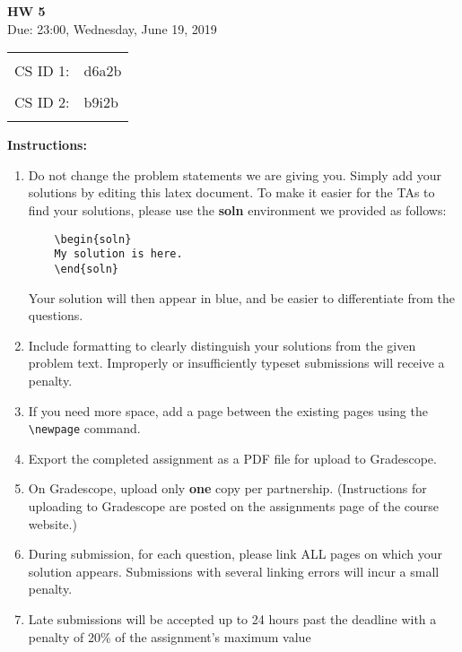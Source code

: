 \documentclass[a4paper, 20pt,fleqn]{article}
\begin{document}

\begin{center}
    \LARGE
    \textbf{HW 5}
    \\[1ex]
    \Large Due: 23:00, Wednesday, June 19, 2019  \\
\end{center}
    \LARGE
\begin{tabular}{rl}
 & \\
CS ID 1: &  d6a2b\\
 & \\
CS ID 2: & b9i2b\\
 & \\
\end{tabular}
\large

\noindent\textbf{\LARGE Instructions:}
\begin{enumerate}
\item Do not change the problem statements we are giving you. Simply add your solutions by editing this latex document. To make it easier for the TAs to find your solutions, please use the \textbf{soln} environment we provided as follows:
\begin{soln}
\begin{verbatim}
    \begin{soln}
    My solution is here.
    \end{soln}
\end{verbatim}
\end{soln}
Your solution will then appear in blue, and be easier to differentiate from the questions.
\item Include formatting to clearly distinguish your solutions from the given problem text. Improperly or insufficiently typeset submissions will receive a penalty.
\item If you need more space, add a page between the existing pages using the \texttt{\textbackslash newpage} command.
\item Export the completed assignment as a PDF file for upload to Gradescope.
\item On Gradescope, upload only \textbf{one} copy per partnership. (Instructions for uploading to Gradescope are posted on the assignments page of the course website.)
\item During submission, for each question, please link ALL pages on which your solution appears. Submissions with several linking errors will incur a small penalty.
\item Late submissions will be accepted up to 24 hours past the deadline with a penalty of 20\% of the assignment’s maximum value
\end{enumerate}
\end{document}
